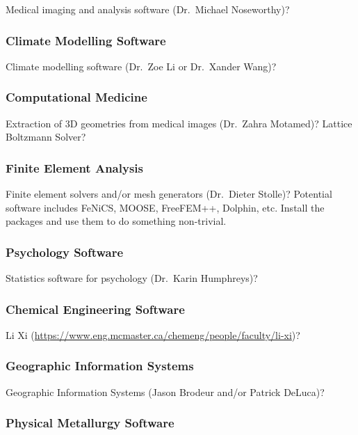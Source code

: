 \documentclass[12pt]{article}
\begin{document}
Medical imaging and analysis software (Dr.\ Michael Noseworthy)?

\subsubsection{Climate Modelling Software}

Climate modelling software (Dr.\ Zoe Li or Dr.\ Xander Wang)?

\subsubsection{Computational Medicine}

Extraction of 3D geometries from medical images (Dr.\ Zahra Motamed)?  Lattice
Boltzmann Solver?

\subsubsection{Finite Element Analysis}

Finite element solvers and/or mesh generators (Dr.\ Dieter Stolle)?  Potential
software includes FeNiCS, MOOSE, FreeFEM++, Dolphin, etc.  Install the packages
and use them to do something non-trivial.

\subsubsection{Psychology Software}

Statistics software for psychology (Dr.\ Karin Humphreys)?

\subsubsection{Chemical Engineering Software}

Li Xi (\url{https://www.eng.mcmaster.ca/chemeng/people/faculty/li-xi})?

\subsubsection{Geographic Information Systems}

Geographic Information Systems (Jason Brodeur and/or Patrick DeLuca)?

\subsubsection{Physical Metallurgy Software}
\end{document}
